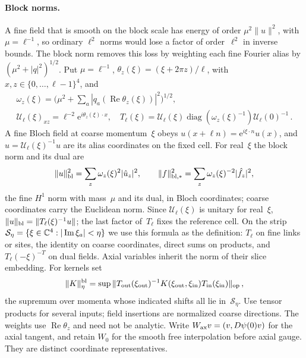\paragraph{Block norms.}
A fine field that is smooth on the block scale has energy of order $\mu^2\|u\|^2$, with $\mu=\ell^{-1}$, so ordinary $\ell^2$ norms would lose a factor of order~$\ell^2$ in inverse bounds. The block norm removes this loss by weighting each fine Fourier alias by $(\mu^2+|q|^2)^{1/2}$. Put $\mu=\ell^{-1}$, $\theta_z(\xi)=(\xi+2\pi z)/\ell$, with $x,z\in\{0,\ldots,\ell-1\}^4$, and
\begin{gather*}
\omega_z(\xi)=\bigl(\mu^2+\sum_a|q_a(\operatorname{Re}\theta_z(\xi))|^2\bigr)^{1/2},\\
\mathcal U_\ell(\xi)_{xz}=\ell^{-2}\mathrm e^{i\theta_z(\xi)\cdot x},\quad
T_\ell(\xi)=\mathcal U_\ell(\xi)\operatorname{diag}(\omega_z(\xi)^{-1})\mathcal U_\ell(0)^{-1}\,.
\end{gather*}
A fine Bloch field at coarse momentum~$\xi$ obeys $u(x+\ell n)=\mathrm e^{i\xi\cdot n}u(x)$, and $\hat u=\mathcal U_\ell(\xi)^{-1}u$ are its alias coordinates on the fixed cell. For real~$\xi$ the block norm and its dual are
\begin{equation*}
\|u\|_{\rm bl}^2=\sum_z\omega_z(\xi)^2|\hat u_z|^2,\qquad
\|f\|_{{\rm bl},*}^2=\sum_z\omega_z(\xi)^{-2}|\hat f_z|^2,
\end{equation*}
the fine $H^1$ norm with mass~$\mu$ and its dual, in Bloch coordinates; coarse coordinates carry the Euclidean norm. Since $\mathcal U_\ell(\xi)$ is unitary for real~$\xi$, $\|u\|_{\rm bl}=\|T_\ell(\xi)^{-1}u\|$; the last factor of~$T_\ell$ fixes the reference cell. On the strip $\mathcal S_\eta=\{\xi\in\mathbb{C}^4:|\operatorname{Im}\xi_a|<\eta\}$ we use this formula as the definition: $T_\ell$ on fine links or sites, the identity on coarse coordinates, direct sums on products, and $T_\ell(-\xi)^{-T}$ on dual fields. Axial variables inherit the norm of their slice embedding. For kernels set
\begin{equation*}
\|K\|_\eta^{\rm bl}=\sup\|T_{\rm out}(\xi_{\rm out})^{-1}K(\xi_{\rm out},\xi_{\rm in})T_{\rm in}(\xi_{\rm in})\|_{\rm op}\,,
\end{equation*}
the supremum over momenta whose indicated shifts all lie in~$\mathcal S_\eta$. Use tensor products for several inputs; field insertions are normalized coarse directions. The weights use $\operatorname{Re}\theta_z$ and need not be analytic. Write $W_{\rm ax}v=(v,D\psi(0)v)$ for the axial tangent, and retain $W_0$ for the smooth free interpolation before axial gauge. They are distinct coordinate representatives.

